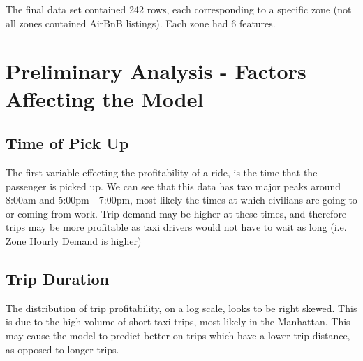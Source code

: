 \documentclass[11pt]{article}
\begin{document}
The final data set contained 242 rows, each corresponding to a specific zone (not all zones contained AirBnB listings). Each zone had 6 features.

\section{Preliminary Analysis - Factors Affecting the Model}
\subsection{Time of Pick Up}
The first variable effecting the profitability of a ride, is the time that the passenger is picked up. We can see that this data has two major peaks around 8:00am and 5:00pm - 7:00pm, most likely the times at which civilians are going to or coming from work. Trip demand may be higher at these times, and therefore trips may be more profitable as taxi drivers would not have to wait as long (i.e. Zone Hourly Demand is higher)

\subsection{Trip Duration}
The distribution of trip profitability, on a log scale, looks to be right skewed. This is due to the high volume of short taxi trips, most likely in the Manhattan. This may cause the model to predict better on trips which have a lower trip distance, as opposed to longer trips. 
\end{document}
